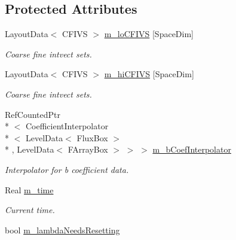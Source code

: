 \subsection*{Protected Attributes}
\begin{DoxyCompactItemize}
\item 
\hypertarget{class_darcy_brinkman_op_a22e511a984f56a6ddfdf90dc6ec5ac0a}{Layout\-Data$<$ C\-F\-I\-V\-S $>$ \hyperlink{class_darcy_brinkman_op_a22e511a984f56a6ddfdf90dc6ec5ac0a}{m\-\_\-lo\-C\-F\-I\-V\-S} \mbox{[}Space\-Dim\mbox{]}}\label{class_darcy_brinkman_op_a22e511a984f56a6ddfdf90dc6ec5ac0a}

\begin{DoxyCompactList}\small\item\em Coarse fine intvect sets. \end{DoxyCompactList}\item 
\hypertarget{class_darcy_brinkman_op_a6177888421b0d13671e8a05a7c25a99a}{Layout\-Data$<$ C\-F\-I\-V\-S $>$ \hyperlink{class_darcy_brinkman_op_a6177888421b0d13671e8a05a7c25a99a}{m\-\_\-hi\-C\-F\-I\-V\-S} \mbox{[}Space\-Dim\mbox{]}}\label{class_darcy_brinkman_op_a6177888421b0d13671e8a05a7c25a99a}

\begin{DoxyCompactList}\small\item\em Coarse fine intvect sets. \end{DoxyCompactList}\item 
\hypertarget{class_darcy_brinkman_op_ab867d6f04206f2212c8e458fc460551e}{Ref\-Counted\-Ptr\\*
$<$ Coefficient\-Interpolator\\*
$<$ Level\-Data$<$ Flux\-Box $>$\\*
, Level\-Data$<$ F\-Array\-Box $>$ $>$ $>$ \hyperlink{class_darcy_brinkman_op_ab867d6f04206f2212c8e458fc460551e}{m\-\_\-b\-Coef\-Interpolator}}\label{class_darcy_brinkman_op_ab867d6f04206f2212c8e458fc460551e}

\begin{DoxyCompactList}\small\item\em Interpolator for b coefficient data. \end{DoxyCompactList}\item 
\hypertarget{class_darcy_brinkman_op_ae3bc28a06e580430b51aaf07db866117}{Real \hyperlink{class_darcy_brinkman_op_ae3bc28a06e580430b51aaf07db866117}{m\-\_\-time}}\label{class_darcy_brinkman_op_ae3bc28a06e580430b51aaf07db866117}

\begin{DoxyCompactList}\small\item\em Current time. \end{DoxyCompactList}\item 
\hypertarget{class_darcy_brinkman_op_a854d500d6bf64372c1249e8b0d919c8e}{bool \hyperlink{class_darcy_brinkman_op_a854d500d6bf64372c1249e8b0d919c8e}{m\-\_\-lambda\-Needs\-Resetting}}\label{class_darcy_brinkman_op_a854d500d6bf64372c1249e8b0d919c8e}


\end{DoxyCompactItemize}
